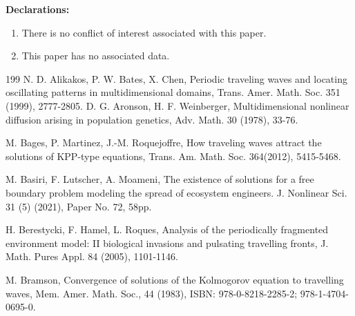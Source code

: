 \documentclass[11pt]{amsart}
\numberwithin{equation}{section}
\begin{document}
\medskip

\noindent
{\bf Declarations:} \begin{enumerate}
\item There is no conflict of interest associated with this paper.
\item This paper has no associated data.

\end{enumerate}


\begin{thebibliography}{199}\setlength{\itemsep}{0mm}\linespread{1}\selectfont
  N. D. Alikakos,  P. W. Bates, X. Chen,  Periodic traveling waves and locating oscillating patterns in
  multidimensional domains,  Trans. Amer. Math. Soc. 351  (1999), 2777-2805.
 D. G. Aronson,  H. F. Weinberger, Multidimensional nonlinear diffusion arising in population genetics, Adv. Math. 30 (1978), 33-76.

M. Bages, P. Martinez, J.-M. Roquejoffre,  How traveling waves attract the solutions of KPP-type equations, Trans. Am. Math. Soc.  364(2012), 5415-5468.

 M. Basiri, F. Lutscher, A. Moameni, The existence of solutions for a free boundary problem modeling the spread of ecosystem engineers. J. Nonlinear Sci. 31 (5) (2021), Paper No. 72, 58pp. 

H.  Berestycki, F. Hamel,  L. Roques, Analysis of the periodically fragmented environment model: II biological invasions and pulsating travelling fronts, J. Math. Pures Appl. 84 (2005), 1101-1146.



 M. Bramson,
 Convergence of solutions of the Kolmogorov equation to travelling waves,
 Mem. Amer. Math. Soc., 44 (1983), ISBN: 978-0-8218-2285-2; 978-1-4704-0695-0.


\end{thebibliography}
\end{document}
